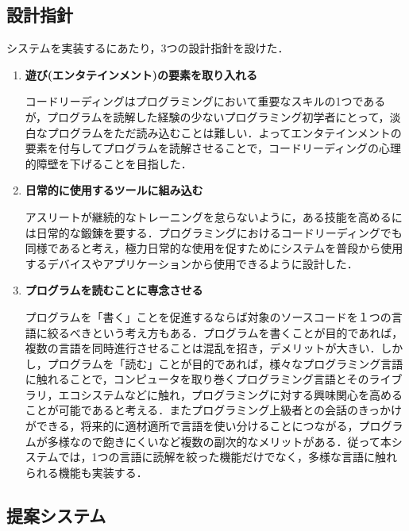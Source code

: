\subsection{設計指針}
システムを実装するにあたり，3つの設計指針を設けた．
\begin{enumerate}
  \item {\bf 遊び(エンタテインメント)の要素を取り入れる}

  コードリーディングはプログラミングにおいて重要なスキルの1つであるが，プログラムを読解した経験の少ないプログラミング初学者にとって，淡白なプログラムをただ読み込むことは難しい．よってエンタテインメントの要素を付与してプログラムを読解させることで，コードリーディングの心理的障壁を下げることを目指した．


  \item {\bf 日常的に使用するツールに組み込む}

  アスリートが継続的なトレーニングを怠らないように，ある技能を高めるには日常的な鍛錬を要する．プログラミングにおけるコードリーディングでも同様であると考え，極力日常的な使用を促すためにシステムを普段から使用するデバイスやアプリケーションから使用できるように設計した．


  \item {\bf プログラムを読むことに専念させる}

  プログラムを「書く」ことを促進するならば対象のソースコードを１つの言語に絞るべきという考え方もある．プログラムを書くことが目的であれば，複数の言語を同時進行させることは混乱を招き，デメリットが大きい．しかし，プログラムを「読む」ことが目的であれば，様々なプログラミング言語に触れることで，コンピュータを取り巻くプログラミング言語とそのライブラリ，エコシステムなどに触れ，プログラミングに対する興味関心を高めることが可能であると考える．またプログラミング上級者との会話のきっかけができる，将来的に適材適所で言語を使い分けることにつながる，プログラムが多様なので飽きにくいなど複数の副次的なメリットがある．従って本システムでは，1つの言語に読解を絞った機能だけでなく，多様な言語に触れられる機能も実装する．

  
\end{enumerate}

\subsection{提案システム}

